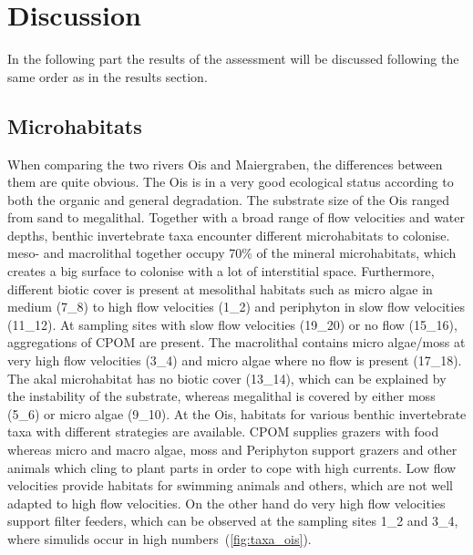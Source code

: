 

\section{Discussion}\label{sec:discussion}                 %

In the following part the results of the assessment will be discussed following the same order as in the results section.

\subsection{Microhabitats}\label{sec:disc_microhabitats}       %


When comparing the two rivers Ois and Maiergraben, the differences between them are quite obvious. The Ois is in a very good ecological status according to both the organic and general degradation. The substrate size of the Ois ranged from sand to megalithal. Together with a broad range of flow velocities and water depths, benthic invertebrate taxa encounter different microhabitats to colonise. meso- and macrolithal together occupy 70\% of the mineral microhabitats, which creates a big surface to colonise with a lot of interstitial space. Furthermore, different biotic cover is present at mesolithal habitats such as micro algae in medium (7\_8) to high flow velocities (1\_2) and periphyton in slow flow velocities (11\_12). At sampling sites with slow flow velocities (19\_20) or no flow (15\_16), aggregations of CPOM are present. The macrolithal contains micro algae/moss at very high flow velocities (3\_4) and micro algae where no flow is present (17\_18). The akal microhabitat has no biotic cover (13\_14), which can be explained by the instability of the substrate, whereas megalithal is covered by either moss (5\_6) or micro algae (9\_10). At the Ois, habitats for various benthic invertebrate taxa with different strategies are available. CPOM supplies grazers with food whereas micro and macro algae, moss and Periphyton support grazers and other animals which cling to plant parts in order to cope with high currents. Low flow velocities provide habitats for swimming animals and others, which are not well adapted to high flow velocities. On the other hand do very high flow velocities support filter feeders, which can be observed at the sampling sites 1\_2 and 3\_4, where simulids occur in high numbers~(\cref{fig:taxa_ois}).


